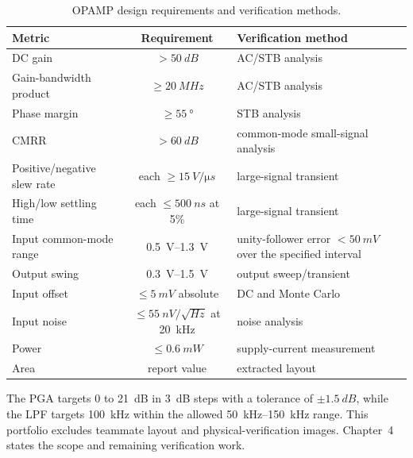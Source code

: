 \begin{table}[htbp]
\centering
\caption{OPAMP design requirements and verification methods.}
\label{tab:requirements}
\small
\renewcommand{\arraystretch}{0.92}
\begin{tabularx}{\textwidth}{@{}Y C Y@{}}
\toprule
Metric & Requirement & Verification method \\
\midrule
DC gain & $>\SI{50}{dB}$ & AC/STB analysis \\
Gain-bandwidth product & $\geq\SI{20}{MHz}$ & AC/STB analysis \\
Phase margin & $\geq\SI{55}{\degree}$ & STB analysis \\
CMRR & $>\SI{60}{dB}$ & common-mode small-signal analysis \\
Positive/negative slew rate & each $\geq\SI{15}{V/\micro s}$ & large-signal transient \\
High/low settling time & each $\leq\SI{500}{ns}$ at 5\% & large-signal transient \\
Input common-mode range & \SIrange{0.5}{1.3}{V} & unity-follower error $<\SI{50}{mV}$ over the specified interval \\
Output swing & \SIrange{0.3}{1.5}{V} & output sweep/transient \\
Input offset & $\leq\SI{5}{mV}$ absolute & DC and Monte Carlo \\
Input noise & $\leq\SI{55}{nV/\sqrt{Hz}}$ at \SI{20}{kHz} & noise analysis \\
Power & $\leq\SI{0.6}{mW}$ & supply-current measurement \\
Area & report value & extracted layout \\
\bottomrule
\end{tabularx}
\renewcommand{\arraystretch}{1}
\end{table}

The PGA targets 0 to \SI{21}{dB} in \SI{3}{dB} steps with a tolerance of $\pm\SI{1.5}{dB}$, while the LPF targets \SI{100}{kHz} within the allowed \SIrange{50}{150}{kHz} range. This portfolio excludes teammate layout and physical-verification images. Chapter~4 states the scope and remaining verification work.
